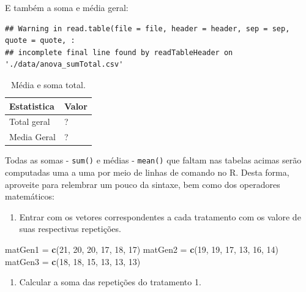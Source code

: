 \documentclass[
]{article}
\newenvironment{Shaded}{\begin{snugshade}}{\end{snugshade}}
\newcommand{\DecValTok}[1]{\textcolor[rgb]{0.00,0.00,0.81}{#1}}
\newcommand{\KeywordTok}[1]{\textcolor[rgb]{0.13,0.29,0.53}{\textbf{#1}}}
\newcommand{\NormalTok}[1]{#1}
\newcommand{\StringTok}[1]{\textcolor[rgb]{0.31,0.60,0.02}{#1}}
\providecommand{\tightlist}{%
  \setlength{\itemsep}{0pt}\setlength{\parskip}{0pt}}
\begin{document}
E também a soma e média geral:

\begin{verbatim}
## Warning in read.table(file = file, header = header, sep = sep, quote = quote, :
## incomplete final line found by readTableHeader on './data/anova_sumTotal.csv'
\end{verbatim}

\begin{table}

\caption{\label{tab:unnamed-chunk-3}Média e soma total.}
\centering
\begin{tabular}[t]{l|l}
\hline
Estatistica & Valor\\
\hline
Total geral & ?\\
\hline
Media Geral & ?\\
\hline
\end{tabular}
\end{table}

Todas as somas - \texttt{sum()} e médias - \texttt{mean()} que faltam nas tabelas acimas serão computadas uma a uma por meio de linhas de comando no R. Desta forma, aproveite para relembrar um pouco da sintaxe, bem como dos operadores matemáticos:

\begin{enumerate}
\def\labelenumi{\arabic{enumi}.}
\tightlist
\item
  Entrar com os vetores correspondentes a cada tratamento com os valore de suas respectivas repetições.
\end{enumerate}

\begin{Shaded}
\begin{Highlighting}[]
\NormalTok{matGen1 =}\StringTok{ }\KeywordTok{c}\NormalTok{(}\DecValTok{21}\NormalTok{, }\DecValTok{20}\NormalTok{, }\DecValTok{20}\NormalTok{, }\DecValTok{17}\NormalTok{, }\DecValTok{18}\NormalTok{, }\DecValTok{17}\NormalTok{)}
\NormalTok{matGen2 =}\StringTok{ }\KeywordTok{c}\NormalTok{(}\DecValTok{19}\NormalTok{, }\DecValTok{19}\NormalTok{, }\DecValTok{17}\NormalTok{, }\DecValTok{13}\NormalTok{, }\DecValTok{16}\NormalTok{, }\DecValTok{14}\NormalTok{)}
\NormalTok{matGen3 =}\StringTok{ }\KeywordTok{c}\NormalTok{(}\DecValTok{18}\NormalTok{, }\DecValTok{18}\NormalTok{, }\DecValTok{15}\NormalTok{, }\DecValTok{13}\NormalTok{, }\DecValTok{13}\NormalTok{, }\DecValTok{13}\NormalTok{)}
\end{Highlighting}
\end{Shaded}

\begin{enumerate}
\def\labelenumi{\arabic{enumi}.}
\setcounter{enumi}{1}
\tightlist
\item
  Calcular a soma das repetições do tratamento 1.
\end{enumerate}
\end{document}
